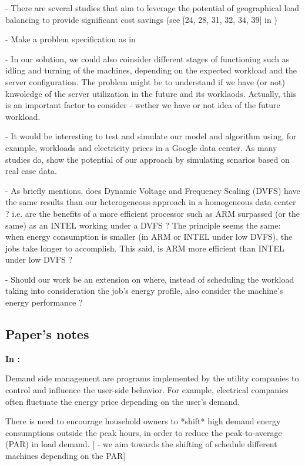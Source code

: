 - There are several studies that aim to leverage the potential of geographical 
  load balancing to provide significant cost savings (see [24, 28, 31, 32, 34,
  39] in \cite{GREENING})

- Make a problem specification as in \cite{CUTTING_BILL}

- In our solution, we could also coinsider different stages of functioning such
  as idling and turning of the machines, depending on the expected workload and
  the server configuration. The problem might be to understand if we have (or
  not) knwoledge of the server utilization in the future and its worklaods.
  Actually, this is an important factor to consider - wether we have or not idea
  of the future workload.  

- It would be interesting to test and simulate our model and algorithm using,
  for example, workloads and electricity prices in a Google data center. As many
  studies do, show the potential of our approach by simulating scnarios based on
  real case data. 

- As \cite{DYN_PRICING_HPC} briefly mentions, does  Dynamic Voltage and Frequency 
  Scaling (DVFS) have the same results than our heterogeneous approach in a
  homogeneous data center ? i.e. are the benefits of a more efficient processor
  such as ARM surpassed (or the same) as an INTEL working under a DVFS ? The
  principle seems the same: when energy consumption is smaller (in ARM or INTEL
  under low DVFS), the jobs take longer to accomplish. This said, is ARM more
  efficient than INTEL under low DVFS ?   

- Should our work be an extension on \cite{DYN_PRICING_HPC} where, instead of
  scheduling the workload taking into consideration the job's energy profile,
  also consider the machine's energy performance ?



\subsection*{Paper's notes}
\textbf{In \cite{FUTURE_SMART_GRID}:}

Demand side management are programs implemented by the utility companies to
control and influence the user-side behavior. For example, electrical companies
often fluctuate the energy price depending on the user's demand.

There is need to encourage household owners to *shift* high demand energy
consumptions outside the peak hours, in order to reduce the peak-to-average
(PAR) in load demand.
[ - we aim towards the shifting of schedule different machines  depending on the PAR] 

